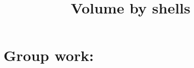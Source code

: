 \documentclass[]{ximera}
\title{Volume by shells}
\begin{document}
\begin{abstract}		\end{abstract}
\maketitle

\section{Group work:}
\end{document}
